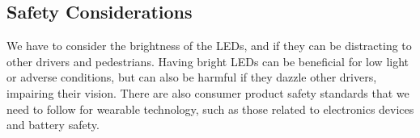 \documentclass[12pt]{article}
\begin{document}
\subsection{Safety Considerations}
We have to consider the brightness of the LEDs, and 
if they can be distracting to other drivers and pedestrians. 
Having bright LEDs can be beneficial for low light or adverse 
conditions, but can also be harmful if they dazzle other drivers, 
impairing their vision. There are also consumer product safety 
standards that we need to follow for wearable technology, such 
as those related to electronics devices and battery safety.




\end{document}
